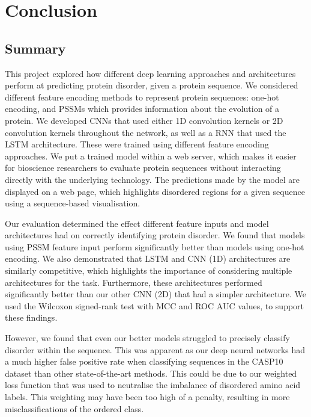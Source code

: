 \documentclass{l4proj}
\begin{document}
\chapter{Conclusion}    

\section{Summary}

This project explored how different deep learning approaches and architectures perform at predicting protein disorder, given a protein sequence. We considered different feature encoding methods to represent protein sequences: one-hot encoding, and PSSMs which provides information about the evolution of a protein. We developed CNNs that used either 1D convolution kernels or 2D convolution kernels throughout the network, as well as a RNN that used the LSTM architecture. These were trained using different feature encoding approaches. We put a trained model within a web server, which makes it easier for bioscience researchers to evaluate protein sequences without interacting directly with the underlying technology. The predictions made by the model are displayed on a web page, which highlights disordered regions for a given sequence using a sequence-based visualisation.

Our evaluation determined the effect different feature inputs and model architectures had on correctly identifying protein disorder. We found that models using PSSM feature input perform significantly better than models using one-hot encoding. We also demonstrated that LSTM and CNN (1D) architectures are similarly competitive, which highlights the importance of considering multiple architectures for the task. Furthermore, these architectures performed significantly better than our other CNN (2D) that had a simpler architecture. We used the Wilcoxon signed-rank test with MCC and ROC AUC values, to support these findings.

However, we found that even our better models struggled to precisely classify disorder within the sequence. This was apparent as our deep neural networks had a much higher false positive rate when classifying sequences in the CASP10 dataset than other state-of-the-art methods. This could be due to our weighted loss function that was used to neutralise the imbalance of disordered amino acid labels. This weighting may have been too high of a penalty, resulting in more misclassifications of the ordered class.
\end{document}
